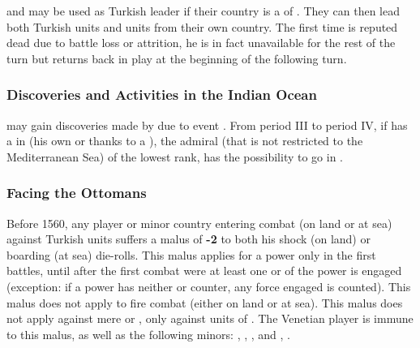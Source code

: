 and  may be used as Turkish leader if
their country is a \VASSAL of \TUR. They can then lead both Turkish
units and units from their own country.
 The first time  is
reputed dead due to battle loss or attrition, he is in fact unavailable
for the rest of the turn but returns back in play at the beginning of
the following turn.

\subsubsection{Discoveries and Activities in the Indian Ocean}
 \TUR may gain discoveries made
by  due to event .
From period III to period IV,  if \TUR has a \TP in   (his own or thanks
to a \dipAT), the admiral (that is not restricted to the Mediterranean Sea)
of the lowest rank, has the possibility to go in .

\subsubsection{Facing the Ottomans}
\aparag Before 1560, any player or minor country entering combat (on
land or at sea) against Turkish units suffers a malus of {\bf -2} to
both his shock (on land) or boarding (at sea) die-rolls.
\aparag This malus applies for a power only in the first battles, until
after the first combat were at least one \ARMY or \FLEET of the power is
engaged (exception: if a power has neither \ARMY or \FLEET counter, any
force engaged is counted).  This malus does not apply to fire combat
(either on land or at sea). This malus does not apply against mere
\VASSAL or \TUR, only against units of \TUR.
\aparag
The Venetian player is immune to this malus, as well as the following
minors: , , ,  and
, .



